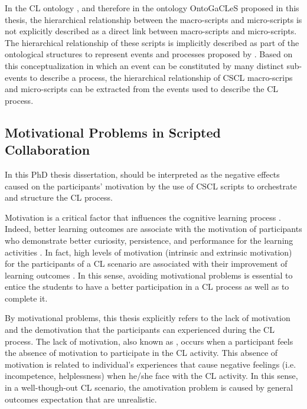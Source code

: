 In the CL ontology \cite{IsotaniInabaIkedaMizoguchi2009}, and therefore in the ontology OntoGaCLeS proposed in this thesis, the hierarchical relationship between the macro-scripts and micro-scripts is not explicitly described as a direct link between macro-scripts and micro-scripts.
The hierarchical relationship of these scripts is implicitly described as part of the ontological structures to represent events and processes proposed by .
Based on this conceptualization in which an event can be constituted by many distinct sub-events to describe a process, the hierarchical relationship of CSCL macro-scrips and micro-scripts can be extracted from the events used to describe the CL process.

\subsection{Motivational Problems in Scripted Collaboration}
\label{subsec:motivation-problem}

In this PhD thesis dissertation,  should be interpreted as the negative effects caused on the participants' motivation by the use of CSCL scripts to orchestrate and structure the CL process.

Motivation is a critical factor that influences the cognitive learning process \cite{DeciRyan1985}.
Indeed, better learning outcomes are associate with the motivation of participants who demonstrate better curiosity, persistence, and performance for the learning activities \cite{DeciRyan1985,Serrano-CamaraParedes-VelascoAlcoverVelazquez-Iturbide2014}.
In fact, high levels of motivation (intrinsic and extrinsic motivation) for the participants of a CL scenario are associated with their improvement of learning outcomes \cite{SerranoCamaraParedesVelascoVelazquez-Iturbide2012}.
In this sense, avoiding motivational problems is essential to entice the students to have a better participation in a CL process as well as to complete it.


By motivational problems, this thesis explicitly refers to the lack of motivation and the demotivation that the participants can experienced during the CL process.
The lack of motivation, also known as  \cite{DeciRyan2010}, occurs when a participant feels the absence of motivation to participate in the CL activity.
This absence of motivation is related to individual's experiences that cause negative feelings (i.e. incompetence, helplessness) when he/she face with the CL activity. 
In this sense, in a well-though-out CL scenario, the amotivation problem is caused by general outcomes expectation that are unrealistic. 



